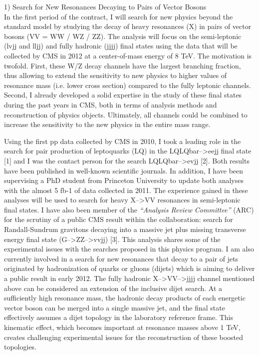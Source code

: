 \documentclass[10pt, a4paper]{article}
\begin{document}
1) Search for New Resonances Decaying to Pairs of Vector Bosons\\
In the first period of the contract, I will search for new physics beyond the 
standard model by studying the decay of heavy resonances (X) in pairs of vector bosons
(VV = WW / WZ / ZZ). The analysis will focus on the semi-leptonic (lvjj and lljj) and 
fully hadronic (jjjj) final states using the data that will be collected by CMS in 2012
at a center-of-mass energy of 8 TeV. 
The motivation is twofold. First, these W/Z decay channels have the largest 
branching fraction, thus allowing to extend the sensitivity to new physics to higher values of 
resonance mass (i.e. lower cross section) compared to the 
fully leptonic channels. Second, I already developed a solid expertise in 
the study of these final states during the past years in CMS, both in terms of 
analysis methods and reconstruction of physics objects. Ultimately, all channels 
could be combined to increase the sensitivity to the new physics in the entire mass range.

Using the first pp data collected by CMS in 2010, I took a leading role 
in the search for pair production of leptoquarks (LQ) in the LQLQbar-->eejj final state [1] and 
I was the contact person for the search LQLQbar-->evjj [2]. 
Both results have been published in 
well-known scientific journals. In addition, I have been supervising 
a PhD student from Princeton University to update both analyses with 
the almost 5 fb-1 of data collected in 2011. The experience gained in these 
analyses will be used to search for heavy X-->VV resonances in semi-leptonic final states.
I have also been member of the {\it``Analysis Review Committee''} (ARC) for the scrutiny of a public CMS result within the collaboration: search for Randall-Sundrum gravitons decaying into 
a massive jet plus missing transverse energy final state (G-->ZZ-->vvjj) [3]. This analysis 
shares some of the experimental issues with the searches proposed in this physics program. 
I am also currently involved in a search for new resonances that decay to a pair 
of jets originated by hadronization of quarks or gluons (dijets) which is 
aiming to deliver a public result in early 2012. 
The fully hadronic X-->VV-->jjjj channel mentioned above 
can be considered an extension of the inclusive dijet search. 
At a sufficiently high resonance mass, the hadronic decay products of each energetic 
vector boson can be merged into a single massive jet, and the 
final state effectively assumes a dijet topology in the laboratory reference frame. 
This kinematic effect, which becomes important at resonance masses above 1 TeV, 
creates challenging  experimental issues for the reconstruction 
of these boosted topologies. \\
\end{document}

